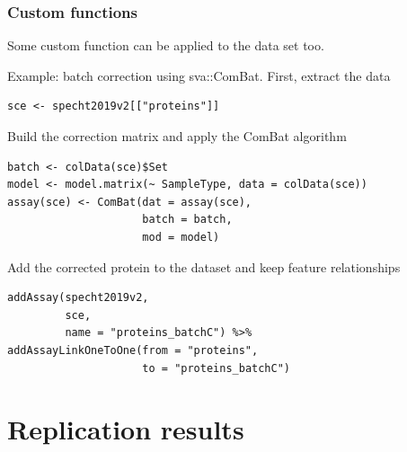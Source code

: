 \documentclass{beamer}
\newcommand{\hcode}[2][lgray]{{\ttfamily\color{vdgray}\colorbox{#1}{#2}}}
\newcommand{\frametitlesection}[1]{\frametitle{\centering #1 \footnotesize \hspace{0pt plus 1 filll} \insertsection}}
\begin{document}
\begin{frame}[fragile]
    \frametitlesection{Custom functions}
    
    Some custom function can be applied to the data set too. 
    
    Example: batch correction using \hcode{sva::ComBat}. First, extract the data
    
    \begin{lstlisting}[basicstyle = \scriptsize\ttfamily\color{vdgray}]
sce <- specht2019v2[["proteins"]]
    \end{lstlisting}
    
    Build the correction matrix and apply the ComBat algorithm
    
    \begin{lstlisting}[basicstyle = \scriptsize\ttfamily\color{vdgray}]
batch <- colData(sce)$Set
model <- model.matrix(~ SampleType, data = colData(sce))
assay(sce) <- ComBat(dat = assay(sce), 
                     batch = batch, 
                     mod = model)
    \end{lstlisting}
    
    Add the corrected protein to the dataset and keep feature relationships
    
    \begin{lstlisting}[basicstyle = \scriptsize\ttfamily\color{vdgray}]
addAssay(specht2019v2,
         sce,
         name = "proteins_batchC") %>%
addAssayLinkOneToOne(from = "proteins",
                     to = "proteins_batchC")
    \end{lstlisting}
    
    
\end{frame}


\section{Replication results}
\end{document}
